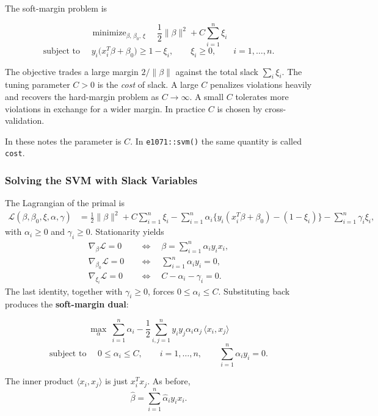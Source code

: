\documentclass[
]{book}
\begin{document}
The soft-margin problem is

\[
\operatorname{minimize}_{\beta,\,\beta_0,\,\xi}\quad
\frac12\|\beta\|^2 + C\sum_{i=1}^{n}\xi_i
\]
\[
\text{subject to }\quad
y_i\bigl(x_i^T\beta+\beta_0\bigr)\ge 1-\xi_i,\qquad
\xi_i\ge 0,\qquad i=1,\ldots,n.
\]

The objective trades a large margin \(2/\|\beta\|\) against the total slack \(\sum_i\xi_i\). The tuning parameter \(C>0\) is the \emph{cost} of slack. A large \(C\) penalizes violations heavily and recovers the hard-margin problem as \(C\to\infty\). A small \(C\) tolerates more violations in exchange for a wider margin. In practice \(C\) is chosen by cross-validation.

In these notes the parameter is \(C\). In \texttt{e1071::svm()} the same quantity is called \texttt{cost}.

\subsubsection*{Solving the SVM with Slack Variables}\label{solving-the-svm-with-slack-variables}

The Lagrangian of the primal is
\begin{align*}
\mathcal{L}(\beta,\beta_0,\xi,\alpha,\gamma)
&= \frac12\|\beta\|^2 + C\sum_{i=1}^{n}\xi_i
- \sum_{i=1}^{n}\alpha_i\bigl\{y_i(x_i^T\beta+\beta_0)-(1-\xi_i)\bigr\}
- \sum_{i=1}^{n}\gamma_i\xi_i,
\end{align*}
with \(\alpha_i\ge 0\) and \(\gamma_i\ge 0\). Stationarity yields
\begin{align*}
\nabla_{\beta}\mathcal{L}=0
&\quad\Leftrightarrow\quad
\beta = \sum_{i=1}^{n}\alpha_i y_i x_i,\\
\nabla_{\beta_0}\mathcal{L}=0
&\quad\Leftrightarrow\quad
\sum_{i=1}^{n}\alpha_i y_i = 0,\\
\nabla_{\xi_i}\mathcal{L}=0
&\quad\Leftrightarrow\quad
C-\alpha_i-\gamma_i=0.
\end{align*}
The last identity, together with \(\gamma_i\ge 0\), forces \(0\le\alpha_i\le C\). Substituting back produces the \textbf{soft-margin dual}:

\[
\max_{\alpha}\
\sum_{i=1}^{n}\alpha_i
- \frac12\sum_{i,j=1}^{n} y_i y_j\alpha_i\alpha_j\,\langle x_i,x_j\rangle
\]
\[
\text{subject to }\quad
0\le\alpha_i\le C,\qquad i=1,\ldots,n,
\qquad
\sum_{i=1}^{n}\alpha_i y_i=0.
\]

The inner product \(\langle x_i,x_j\rangle\) is just \(x_i^T x_j\). As before,
\[
\hat\beta = \sum_{i=1}^{n}\hat\alpha_i y_i x_i.
\]
\end{document}

